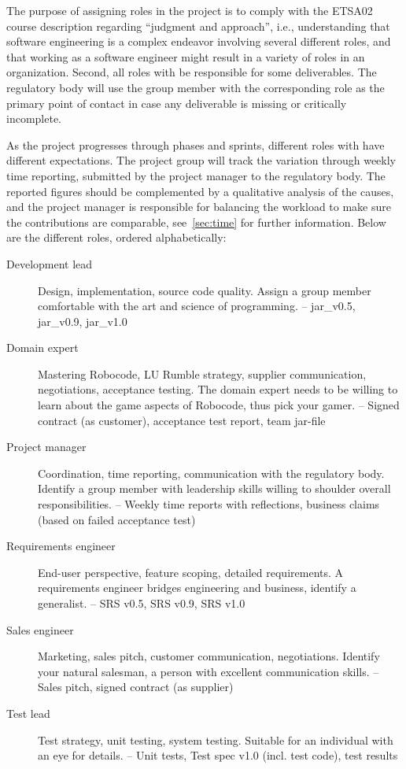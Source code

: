 \documentclass{scrreprt}
\begin{document}
The purpose of assigning roles in the project is to comply with the ETSA02 course description regarding ``judgment and approach'', i.e., understanding that software engineering is a complex endeavor involving several different roles, and that working as a software engineer might  result in a variety of roles in an organization. Second, all roles with be responsible for some deliverables. The regulatory body will use the group member with the corresponding role as the primary point of contact in case any deliverable is missing or critically incomplete.

As the project progresses through phases and sprints, different roles with have different expectations. The project group will track the variation through weekly time reporting, submitted by the project manager to the regulatory body. The reported figures should be complemented by a qualitative analysis of the causes, and the project manager is responsible for balancing the workload to make sure the contributions are comparable, see~\ref{sec:time} for further information. Below are the different roles, ordered alphabetically:

\begin{description}
\item[Development lead] Design, implementation, source code quality. Assign a group member comfortable with the art and science of programming. -- jar_v0.5, jar_v0.9, jar_v1.0
\item[Domain expert] Mastering Robocode, LU Rumble strategy, supplier communication, negotiations, acceptance testing. The domain expert needs to be willing to learn about the game aspects of Robocode, thus pick your gamer. -- Signed contract (as customer), acceptance test report, team jar-file
\item[Project manager] Coordination, time reporting, communication with the regulatory body. Identify a group member with leadership skills willing to shoulder overall responsibilities. -- Weekly time reports with reflections, business claims (based on failed acceptance test)
\item[Requirements engineer] End-user perspective, feature scoping, detailed requirements. A requirements engineer bridges engineering and business, identify a generalist. -- SRS v0.5, SRS v0.9, SRS v1.0
\item[Sales engineer] Marketing, sales pitch, customer communication, negotiations. Identify your natural salesman, a person with excellent communication skills. -- Sales pitch, signed contract (as supplier)
\item[Test lead] Test strategy, unit testing, system testing. Suitable for an individual with an eye for details. -- Unit tests, Test spec v1.0 (incl. test code), test results
\end{description}
\end{document}

